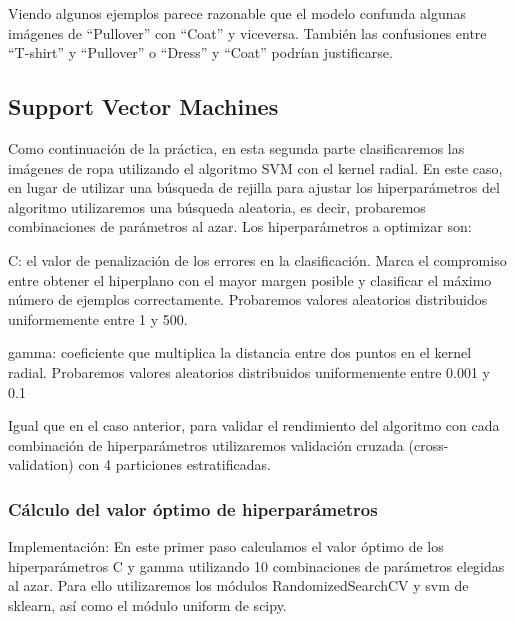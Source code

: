 \documentclass[11pt]{article}
\begin{document}
Viendo algunos ejemplos parece razonable que el modelo confunda algunas
imágenes de ``Pullover'' con ``Coat'' y viceversa. También las
confusiones entre ``T-shirt'' y ``Pullover'' o ``Dress'' y ``Coat''
podrían justificarse.\\

    \hypertarget{support-vector-machines}{%
\subsection{Support Vector Machines}\label{support-vector-machines}}

Como continuación de la práctica, en esta segunda parte clasificaremos
las imágenes de ropa utilizando el algoritmo SVM con el kernel radial.
En este caso, en lugar de utilizar una búsqueda de rejilla para ajustar
los hiperparámetros del algoritmo utilizaremos una búsqueda aleatoria,
es decir, probaremos combinaciones de parámetros al azar. Los
hiperparámetros a optimizar son:

C: el valor de penalización de los errores en la clasificación. Marca el
compromiso entre obtener el hiperplano con el mayor margen posible y
clasificar el máximo número de ejemplos correctamente. Probaremos
valores aleatorios distribuidos uniformemente entre 1 y 500.

gamma: coeficiente que multiplica la distancia entre dos puntos en el
kernel radial. Probaremos valores aleatorios distribuidos uniformemente
entre 0.001 y 0.1

Igual que en el caso anterior, para validar el rendimiento del algoritmo
con cada combinación de hiperparámetros utilizaremos validación cruzada
(cross-validation) con 4 particiones estratificadas.

    \hypertarget{cuxe1lculo-del-valor-uxf3ptimo-de-hiperparuxe1metros}{%
\subsubsection{Cálculo del valor óptimo de
hiperparámetros}\label{cuxe1lculo-del-valor-uxf3ptimo-de-hiperparuxe1metros}}

Implementación: En este primer paso calculamos el valor óptimo de los
hiperparámetros C y gamma utilizando 10 combinaciones de parámetros
elegidas al azar. Para ello utilizaremos los módulos RandomizedSearchCV
y svm de sklearn, así como el módulo uniform de scipy.
\end{document}

